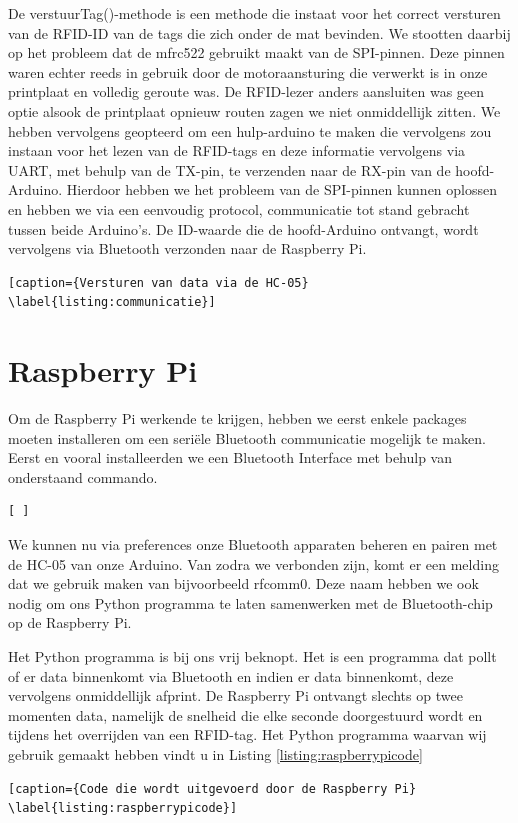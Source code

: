 De verstuurTag()-methode is een methode die instaat voor het correct versturen van de RFID-ID van de tags die zich onder de mat bevinden. We stootten daarbij op het probleem dat de mfrc522 gebruikt maakt van de SPI-pinnen. Deze pinnen waren echter reeds in gebruik door de motoraansturing die verwerkt is in onze printplaat en volledig geroute was. De RFID-lezer anders aansluiten was geen optie alsook de printplaat opnieuw routen zagen we niet onmiddellijk zitten. We hebben vervolgens geopteerd om een hulp-arduino te maken die vervolgens zou instaan voor het lezen van de RFID-tags en deze informatie vervolgens via UART, met behulp van de TX-pin, te verzenden naar de RX-pin van de hoofd-Arduino. Hierdoor hebben we het probleem van de SPI-pinnen kunnen oplossen en hebben we via een eenvoudig protocol, communicatie tot stand gebracht tussen beide Arduino's. De ID-waarde die de hoofd-Arduino ontvangt, wordt vervolgens via Bluetooth verzonden naar de Raspberry Pi.


\begin{lstlisting}[caption={Versturen van data via de HC-05} \label{listing:communicatie}]
\end{lstlisting}

\section{Raspberry Pi}


Om de Raspberry Pi werkende te krijgen, hebben we eerst enkele packages moeten installeren om een seri\"ele Bluetooth communicatie mogelijk te maken. Eerst en vooral installeerden we een Bluetooth Interface met behulp van onderstaand commando.


\begin{lstlisting}[ ]
\end{lstlisting}

We kunnen nu via preferences onze Bluetooth apparaten beheren en pairen met de HC-05 van onze Arduino. Van zodra we verbonden zijn, komt er een melding dat we gebruik maken van bijvoorbeeld rfcomm0. Deze naam hebben we ook nodig om ons Python programma te laten samenwerken met de Bluetooth-chip op de Raspberry Pi. 

Het Python programma is bij ons vrij beknopt. Het is een programma dat pollt of er data binnenkomt via Bluetooth en indien er data binnenkomt, deze vervolgens onmiddellijk afprint. De Raspberry Pi ontvangt slechts op twee momenten data, namelijk de snelheid die elke seconde doorgestuurd wordt en tijdens het overrijden van een RFID-tag. Het Python programma waarvan wij gebruik gemaakt hebben vindt u in Listing \ref{listing:raspberrypicode}



\begin{lstlisting}[caption={Code die wordt uitgevoerd door de Raspberry Pi} \label{listing:raspberrypicode}]
\end{lstlisting}



